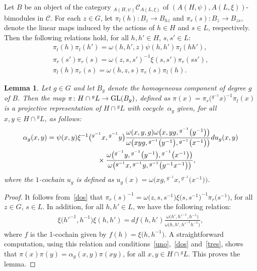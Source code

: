 \documentclass[11pt]{article}
\numberwithin{equation}{section}
\newtheorem{Lemma}[Theorem]{Lemma}
 { \theoremstyle{definition}
\newtheorem{Example}[Theorem]{Example}
\newtheorem{Remark}[Theorem]{Remark} }
\newcommand{\C}{{\mathcal C}}
\newcommand{\1}{\textbf{1}}
\begin{document}
Let $B$ be an object of the category $_{A(H, \psi)}\C_{A(L, \xi)}$ of $(A(H, \psi), A(L, \xi))$-bimodules in $\C$. For each $z\in G$, let $\pi_l(h)\colon B_z \to B_{hz}$ and $\pi_r(s)\colon B_z \to B_{zs}$, denote the linear maps induced by the actions of $h \in H$ and $s \in L$, respectively. Then the following relations hold, for all $h, h' \in H$, $s, s' \in L$:
\begin{gather}\label{uno}\pi_l(h)\pi_l(h') = \omega(h, h', z) \psi(h, h') \pi_l(hh'), \\
\label{dos}\pi_r(s')\pi_r(s) = \omega(z, s, s')^{-1} \xi(s, s') \pi_r(ss'),\\
\label{tres}\pi_l(h)\pi_r(s) = \omega(h, z, s) \pi_r(s)\pi_l(h).\end{gather}

\begin{Lemma}\label{alfa-g} Let $g \in G$ and let $B_g$ denote the homogeneous component of degree $g$ of $B$. Then the map $\pi\colon H \cap {}^gL \to \text{\rm GL}(B_g)$, defined as $\pi(x) = \pi_r\big({}^{g^{-1}}x\big)^{-1}\pi_l(x)$ is a projective representation of $H \cap {}^gL$ with cocycle~$\alpha_g$ given, for all $x, y \in H \cap {}^gL$, as follows:
\begin{gather*}
\alpha_g(x, y) = \psi(x, y) \xi^{-1}\big({}^{g^{-1}}x, {}^{g^{-1}}y\big) \frac{\omega(x, y, g) \omega\big(x, yg, {}^{g^{-1}}\big(y^{-1}\big)\big)}
{\omega\big(xyg, {}^{g^{-1}}\big(y^{-1}\big),{} ^{g^{-1}}\big(x^{-1}\big)\big)} du_g(x, y) \\
\hphantom{\alpha_g(x, y) =}{} \times \frac{\omega\big({}^{g^{-1} } y, {}^{g^{-1}}\big(y^{-1}\big), {}^{g^{-1}}\big(x^{-1}\big)\big)} {\omega\big({}^{g^{-1}}x, {} ^{g^{-1}}y, {} ^{g^{-1}}\big(y^{-1}x^{-1}\big)\big)},
\end{gather*}
 where the $1$-cochain $u_g$ is defined as $u_g(x) = \omega\big(xg, {} ^{g^{-1}} x, {}^{g^{-1}} \big(x^{-1}\big)\big)$. \end{Lemma}

\begin{proof} It follows from~\eqref{dos} that $\pi_r(s)^{-1} = \omega\big(z, s, s^{-1}\big) \xi\big(s, s^{-1}\big)^{-1} \pi_r\big(s^{-1}\big)$, for all $z\in G$, $s \in L$. In addition, for all $h, h' \in L$, we have the following relation:
\begin{gather*}\xi \big({h'}^{-1}, h^{-1}\big) \xi (h, h') = df(h, h')\frac{\omega\big(h', {h'}^{-1}, h^{-1}\big)}
	{\omega\big(h, h', {h'}^{-1}h^{-1}\big)},\end{gather*}
where $f$ is the 1-cochain given by $f(h) = \xi\big(h, h^{-1}\big)$. A straightforward computation, using this relation and conditions~\eqref{uno},~\eqref{dos} and~\eqref{tres}, shows that $\pi(x) \pi(y) = \alpha_g(x, y) \pi(xy)$, for all $x, y \in H \cap {}^gL$. This proves the lemma. \end{proof}
\end{document}
